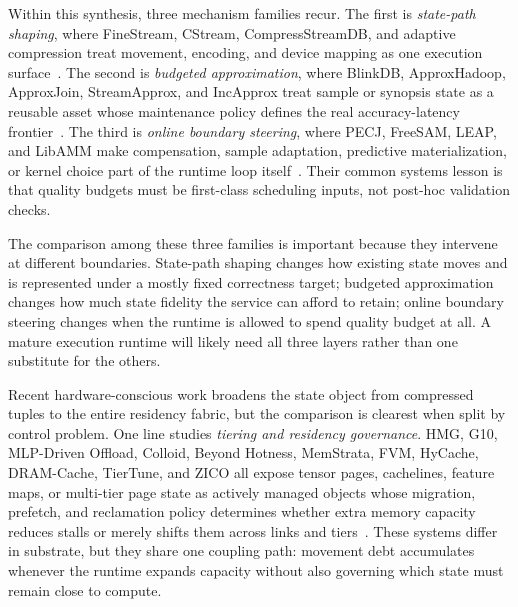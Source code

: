 \documentclass[acmsmall,screen,review]{acmart}
\begin{document}
Within this synthesis, three mechanism families recur. The first is \emph{state-path shaping}, where FineStream, CStream, CompressStreamDB, and adaptive compression treat movement, encoding, and device mapping as one execution surface~\cite{zhang2020finestream,zeng2024cstream,zhang2023compressstreamdb,yu2025adaptivecompression}. The second is \emph{budgeted approximation}, where BlinkDB, ApproxHadoop, ApproxJoin, StreamApprox, and IncApprox treat sample or synopsis state as a reusable asset whose maintenance policy defines the real accuracy-latency frontier~\cite{agarwal2013blinkdb,goiri2015approxhadoop,wang2018approxjoin,hu2018streamapprox,chen2018incapprox}. The third is \emph{online boundary steering}, where PECJ, FreeSAM, LEAP, and LibAMM make compensation, sample adaptation, predictive materialization, or kernel choice part of the runtime loop itself~\cite{zeng2024pecj,tang2025freesam,xu2024leap,zeng2024libamm}. Their common systems lesson is that quality budgets must be first-class scheduling inputs, not post-hoc validation checks.

The comparison among these three families is important because they intervene at different boundaries. State-path shaping changes how existing state moves and is represented under a mostly fixed correctness target; budgeted approximation changes how much state fidelity the service can afford to retain; online boundary steering changes when the runtime is allowed to spend quality budget at all. A mature execution runtime will likely need all three layers rather than one substitute for the others.

Recent hardware-conscious work broadens the state object from compressed tuples to the entire residency fabric, but the comparison is clearest when split by control problem. One line studies \emph{tiering and residency governance}. HMG, G10, MLP-Driven Offload, Colloid, Beyond Hotness, MemStrata, FVM, HyCache, DRAM-Cache, TierTune, and ZICO all expose tensor pages, cachelines, feature maps, or multi-tier page state as actively managed objects whose migration, prefetch, and reclamation policy determines whether extra memory capacity reduces stalls or merely shifts them across links and tiers~\cite{ren2020hmg,zhang2023g10,maurya2025mlpoffload,vuppalapati2024colloid,liu2025beyondhotness,zhong2024memstrata,kwon2020fvm,jha2025hycache,hong2024dramcache,lee2025tiertune,zico21}. These systems differ in substrate, but they share one coupling path: movement debt accumulates whenever the runtime expands capacity without also governing which state must remain close to compute.
\end{document}
